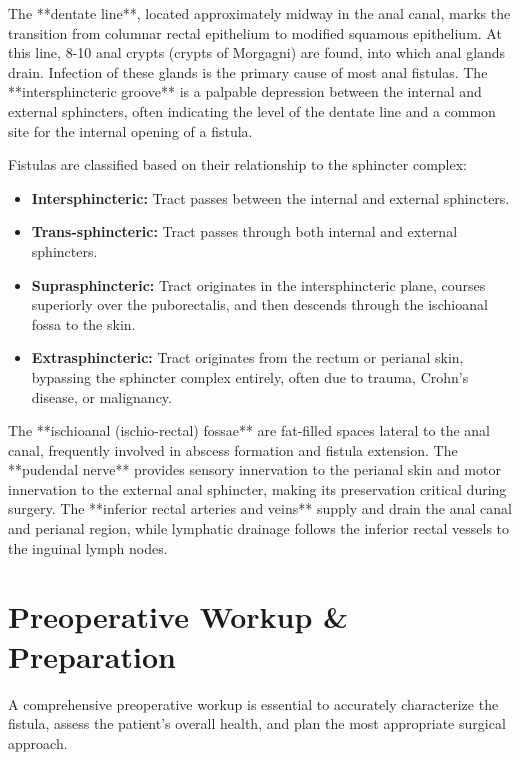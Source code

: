 The **dentate line**, located approximately midway in the anal canal, marks the transition from columnar rectal epithelium to modified squamous epithelium. At this line, 8-10 anal crypts (crypts of Morgagni) are found, into which anal glands drain. Infection of these glands is the primary cause of most anal fistulas. The **intersphincteric groove** is a palpable depression between the internal and external sphincters, often indicating the level of the dentate line and a common site for the internal opening of a fistula.

Fistulas are classified based on their relationship to the sphincter complex:
\begin{itemize}
  \item \textbf{Intersphincteric:} Tract passes between the internal and external sphincters.
  \item \textbf{Trans-sphincteric:} Tract passes through both internal and external sphincters.
  \item \textbf{Suprasphincteric:} Tract originates in the intersphincteric plane, courses superiorly over the puborectalis, and then descends through the ischioanal fossa to the skin.
  \item \textbf{Extrasphincteric:} Tract originates from the rectum or perianal skin, bypassing the sphincter complex entirely, often due to trauma, Crohn's disease, or malignancy.
\end{itemize}

The **ischioanal (ischio-rectal) fossae** are fat-filled spaces lateral to the anal canal, frequently involved in abscess formation and fistula extension. The **pudendal nerve** provides sensory innervation to the perianal skin and motor innervation to the external anal sphincter, making its preservation critical during surgery. The **inferior rectal arteries and veins** supply and drain the anal canal and perianal region, while lymphatic drainage follows the inferior rectal vessels to the inguinal lymph nodes.

\section*{Preoperative Workup \& Preparation}
A comprehensive preoperative workup is essential to accurately characterize the fistula, assess the patient's overall health, and plan the most appropriate surgical approach.

